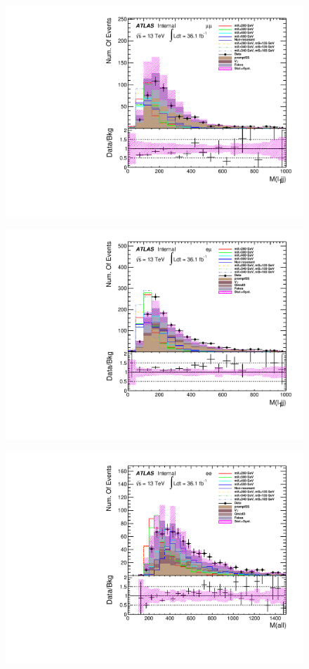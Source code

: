 \begin{figure}[h]
\begin{minipage}[t]{0.33\linewidth}
 \includegraphics[width=1.0\textwidth]{fig/dataMC_low_Njet_CR/m_l1jj_mumu.pdf}\label{fig:dataMC_low_Njet_CR:m_l1jj_mumu.pdf}
 \end{minipage}
 \begin{minipage}[t]{0.33\linewidth}
 \centering
 \includegraphics[width=1.0\textwidth]{fig/dataMC_low_Njet_CR/m_l1jj_emu.pdf}\label{fig:dataMC_low_Njet_CR:m_l1jj_emu.pdf}
 \end{minipage}
 \begin{minipage}[t]{0.33\linewidth}
 \centering
 \includegraphics[width=1.0\textwidth]{fig/dataMC_low_Njet_CR/m_all_ee.pdf}\label{fig:dataMC_low_Njet_CR:m_all_ee.pdf}

\end{minipage}
\end{figure}
